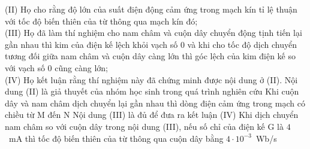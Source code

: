 \begin{ex}
\begin{center}
		\end{center}
		(II) Họ cho rằng độ lớn của suất điện động cảm ứng trong mạch kín tỉ lệ thuận với tốc độ biến thiên của từ thông qua mạch kín đó;\\
		(III) Họ đã làm thí nghiệm cho nam châm và cuộn dây chuyển động tịnh tiến lại gần nhau thì kim của điện kế lệch khỏi vạch số 0 và khi cho tốc độ dịch chuyển tương đối giữa nam châm và cuộn dây càng lớn thì góc lệch của kim điện kế so với vạch số 0 cũng càng lớn;\\
		(IV) Họ kết luận rằng thí nghiệm này đã chứng minh được nội dung ở (II).
		\choiceTFt
		{\True Nội dung (II) là giả thuyết của nhóm học sinh trong quá trình nghiên cứu}
		{Khi cuộn dây và nam châm dịch chuyển lại gần nhau thì dòng điện cảm ứng trong mạch có chiều từ M đến N}
		{Nội dung (III) là đủ để đưa ra kết luận (IV)}
		{\True Khi dịch chuyển nam châm so với cuộn dây trong nội dung (III), nếu số chỉ của điện kế G là $4$~mA thì tốc độ biến thiên của từ thông qua cuộn dây bằng $4\cdot 10^{-3}$~Wb/s}
	\end{ex}

